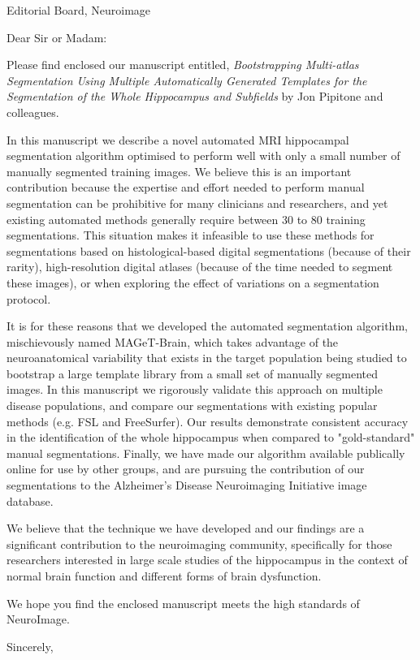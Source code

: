 \documentclass[12pt]{letter}
\begin{document}
 
\begin{letter}{Editorial Board, Neuroimage}
\opening{Dear Sir or Madam:}
\thispagestyle{fancy}

Please find enclosed our manuscript entitled, {\em Bootstrapping Multi-atlas
Segmentation Using Multiple Automatically Generated Templates for the
Segmentation of the Whole Hippocampus and Subfields} by Jon Pipitone and
colleagues.

In this manuscript we describe a novel automated MRI hippocampal segmentation
algorithm optimised to perform well with only a small number of manually
segmented training images. We believe this is an important contribution because
the expertise and effort needed to perform manual segmentation can be
prohibitive for many clinicians and researchers, and yet existing automated
methods generally require between 30 to 80 training segmentations. This
situation makes it infeasible to use these methods for segmentations based on
histological-based digital segmentations (because of their rarity),
high-resolution digital atlases (because of the time needed to segment these
images), or when exploring the effect of variations on a segmentation protocol.

It is for these reasons that we developed the automated segmentation algorithm,
mischievously named MAGeT-Brain, which takes advantage of the neuroanatomical
variability that exists in the target population being studied to bootstrap a
large template library from a small set of manually segmented images. In this
manuscript we rigorously validate this approach on multiple disease
populations, and compare our segmentations with existing popular methods (e.g.
FSL and FreeSurfer).  Our results demonstrate consistent accuracy in the
identification of the whole hippocampus when compared to "gold-standard" manual
segmentations.  Finally, we have made our algorithm available publically online
for use by other groups, and are pursuing the contribution of our segmentations
to the Alzheimer's Disease Neuroimaging Initiative image database.

We believe that the technique we have developed and our findings are a
significant contribution to the neuroimaging community, specifically for those
researchers interested in large scale studies of the hippocampus in the context
of normal brain function and different forms of brain dysfunction.

We hope you find the enclosed manuscript meets the high standards of
NeuroImage.

 
\closing{Sincerely,}
 
 
\end{letter}
\end{document}
